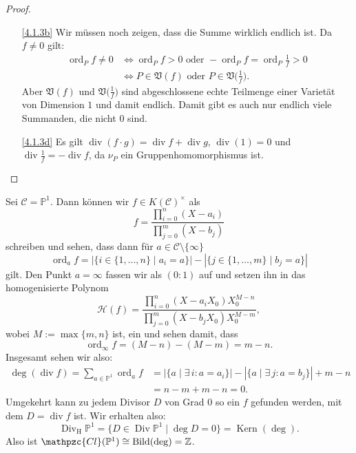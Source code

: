 \documentclass[a4paper,12pt,index=toc]{scrbook}
\theoremstyle{keinenummern} %
\def\CC{\mathcal{C}}
\def\V{\mathfrak{V}}
\def\P{\mathbb{P}}
\renewcommand{\H}{\mathcal{H}} %
\newcommand{\Cl}{\mathpzc{Cl}}
\newcommand{\Kern}{\operatorname{Kern}}
\newcommand{\Bild}{\operatorname{Bild}}
\newcommand{\Div}{\operatorname{Div}}
\newcommand{\Divh}{\Div_{\mathrm{H}}}
\renewcommand{\div}{\operatorname{div}}
\newcommand{\ord}{\operatorname{ord}}
\newcommand{\card}[1]{|#1|}
\renewcommand{\dotsc}{\ensuremath{\!...}}
\newcommand{\set}[1]{\ensuremath{\mathbb{#1}}}
\newcommand{\Z}{\set{Z}}
\begin{document}
\begin{proof}\begin{enumerate}
\item[\ref{4.1.3b}] Wir müssen noch zeigen, dass die Summe wirklich endlich ist. Da $f\neq 0$ gilt:
\begin{align*}
\ord_{P}f\neq 0&\iff\ord_{P}f>0\text{ oder }-\ord_{P}f=\ord_{P}\tfrac{1}{f}>0\\
&\iff P\in\V(f)\text{ oder }P\in\V\bigl(\tfrac{1}{f}\bigr).
\end{align*}
Aber $\V(f)$ und $\V\bigl(\tfrac{1}{f}\bigr)$ sind abgeschlossene echte Teilmenge einer Varietät von Dimension $1$ und damit endlich. Damit gibt es auch nur endlich viele Summanden, die nicht $0$ sind.
\item[\ref{4.1.3d}] Es gilt $\div(f\cdot g)=\div f + \div g$, $\div(1)=0$ und $\div\frac{1}{f}=-\div f$, da $\nu_{P}$ ein Gruppenhomomorphismus ist.
\end{enumerate}\end{proof}

\begin{bsp}\label{4.1.4}
Sei $\CC=\P^{1}$. Dann können wir $f\in K(\CC)^{\times}$ als
\[f=\frac{\displaystyle\prod_{i=0}^{n}(X-a_{i})}{\displaystyle\prod_{j=0}^{m}(X-b_{j})}\]
schreiben und sehen, dass dann für $a\in\CC\setminus\{\infty\}$
\[\ord_{a}f=\card{\{i\in\{1,\dotsc,n\}\mid a_{i}=a\}}-\card{\{j\in\{1,\dotsc,m\}\mid b_{j}=a\}}\]
gilt. Den Punkt $a=\infty$ fassen wir als $(0:1)$ auf und setzen ihn in das homogenisierte Polynom
\[\H(f)=\frac{\displaystyle\prod_{i=0}^{n}(X-a_{i}X_{0})X_{0}^{M-n}}{\displaystyle\prod_{j=0}^{m}(X-b_{j}X_{0})X_{0}^{M-m}},\]
wobei $M:=\max\{m,n\}$ ist, ein und sehen damit, dass
\[\ord_{\infty}f=(M-n)-(M-m)=m-n.\]
Insgesamt sehen wir also:
\begin{align*}
\deg(\div f)=\sum_{a\in\P^{1}}\ord_{a}f&=\card{\{a\mid \exists\, i: a=a_{i}\}}-\card{\{a\mid \exists\, j: a=b_{j}\}}+m-n\\
&=n-m+m-n=0.
\end{align*}
Umgekehrt kann zu jedem Divisor $D$ von Grad $0$ so ein $f$ gefunden werden, mit dem $D=\div f$ ist. Wir erhalten also:
\[\Divh\P^{1}=\{D\in\Div\P^{1}\mid\deg D=0\}=\Kern(\deg).\]
Also ist $\Cl(\P^{1})\cong\Bild(\deg)=\Z$.
\end{bsp}
\end{document}
